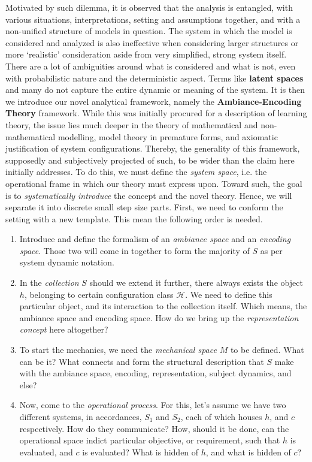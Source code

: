 Motivated by such dilemma, it is observed that the analysis is entangled, with various situations, interpretations, setting and assumptions together, and with a non-unified structure of models in question. The system in which the model is considered and analyzed is also ineffective when considering larger structures or more `realistic' consideration aside from very simplified, strong system itself. There are a lot of ambiguities around what is considered and what is not, even with probabilistic nature and the deterministic aspect. Terms like \textbf{latent spaces} and many do not capture the entire dynamic or meaning of the system. It is then we introduce our novel analytical framework, namely the \textbf{Ambiance-Encoding Theory} framework. While this was initially procured for a description of learning theory, the issue lies much deeper in the theory of mathematical and non-mathematical modelling, model theory in premature forms, and axiomatic justification of system configurations. Thereby, the generality of this framework, supposedly and subjectively projected of such, to be wider than the claim here initially addresses. To do this, we must define the \textit{system space}, i.e. the operational frame in which our theory must express upon. Toward such, the goal is to \textit{systematically introduce} the concept and the novel theory. Hence, we will separate it into discrete small step size parts. First, we need to conform the setting with a new template. This mean the following order is needed. 
\begin{enumerate}[leftmargin=0.5cm,itemsep=1pt,topsep=1pt]
  \item Introduce and define the formalism of an \textit{ambiance space} and an \textit{encoding space}. Those two will come in together to form the majority of $S$ as per system dynamic notation. 
  \item In the \textit{collection} $S$ should we extend it further, there always exists the object $h$, belonging to certain configuration class $\mathcal{H}$. We need to define this particular object, and its interaction to the collection itself. Which means, the ambiance space and encoding space. How do we bring up the \textit{representation concept} here altogether? 
  \item To start the mechanics, we need the \textit{mechanical space} $M$ to be defined. What can be it? What connects and form the structural description that $S$ make with the ambiance space, encoding, representation, subject dynamics, and else? 
  \item Now, come to the \textit{operational process}. For this, let's assume we have two different systems, in accordances, $S_{1}$ and $S_{2}$, each of which houses $h$, and $c$ respectively. How do they communicate? How, should it be done, can the operational space indict particular objective, or requirement, such that $h$ is evaluated, and $c$ is evaluated? What is hidden of $h$, and what is hidden of $c$? 
\end{enumerate}
